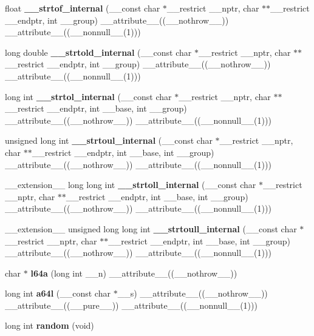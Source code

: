 \begin{DoxyCompactItemize}
\item 
float {\bf \_\-\_\-strtof\_\-internal} (\_\-\_\-const char $\ast$\_\-\_\-restrict \_\-\_\-nptr, char $\ast$$\ast$\_\-\_\-restrict \_\-\_\-endptr, int \_\-\_\-group) \_\-\_\-attribute\_\-\_\-((\_\-\_\-nothrow\_\-\_\-)) \_\-\_\-attribute\_\-\_\-((\_\-\_\-nonnull\_\-\_\-(1)))
\item 
long double {\bf \_\-\_\-strtold\_\-internal} (\_\-\_\-const char $\ast$\_\-\_\-restrict \_\-\_\-nptr, char $\ast$$\ast$\_\-\_\-restrict \_\-\_\-endptr, int \_\-\_\-group) \_\-\_\-attribute\_\-\_\-((\_\-\_\-nothrow\_\-\_\-)) \_\-\_\-attribute\_\-\_\-((\_\-\_\-nonnull\_\-\_\-(1)))
\item 
long int {\bf \_\-\_\-strtol\_\-internal} (\_\-\_\-const char $\ast$\_\-\_\-restrict \_\-\_\-nptr, char $\ast$$\ast$\_\-\_\-restrict \_\-\_\-endptr, int \_\-\_\-base, int \_\-\_\-group) \_\-\_\-attribute\_\-\_\-((\_\-\_\-nothrow\_\-\_\-)) \_\-\_\-attribute\_\-\_\-((\_\-\_\-nonnull\_\-\_\-(1)))
\item 
unsigned long int {\bf \_\-\_\-strtoul\_\-internal} (\_\-\_\-const char $\ast$\_\-\_\-restrict \_\-\_\-nptr, char $\ast$$\ast$\_\-\_\-restrict \_\-\_\-endptr, int \_\-\_\-base, int \_\-\_\-group) \_\-\_\-attribute\_\-\_\-((\_\-\_\-nothrow\_\-\_\-)) \_\-\_\-attribute\_\-\_\-((\_\-\_\-nonnull\_\-\_\-(1)))
\item 
\_\-\_\-extension\_\-\_\- long long int {\bf \_\-\_\-strtoll\_\-internal} (\_\-\_\-const char $\ast$\_\-\_\-restrict \_\-\_\-nptr, char $\ast$$\ast$\_\-\_\-restrict \_\-\_\-endptr, int \_\-\_\-base, int \_\-\_\-group) \_\-\_\-attribute\_\-\_\-((\_\-\_\-nothrow\_\-\_\-)) \_\-\_\-attribute\_\-\_\-((\_\-\_\-nonnull\_\-\_\-(1)))
\item 
\_\-\_\-extension\_\-\_\- unsigned long long int {\bf \_\-\_\-strtoull\_\-internal} (\_\-\_\-const char $\ast$\_\-\_\-restrict \_\-\_\-nptr, char $\ast$$\ast$\_\-\_\-restrict \_\-\_\-endptr, int \_\-\_\-base, int \_\-\_\-group) \_\-\_\-attribute\_\-\_\-((\_\-\_\-nothrow\_\-\_\-)) \_\-\_\-attribute\_\-\_\-((\_\-\_\-nonnull\_\-\_\-(1)))
\item 
char $\ast$ {\bf l64a} (long int \_\-\_\-n) \_\-\_\-attribute\_\-\_\-((\_\-\_\-nothrow\_\-\_\-))
\item 
long int {\bf a64l} (\_\-\_\-const char $\ast$\_\-\_\-s) \_\-\_\-attribute\_\-\_\-((\_\-\_\-nothrow\_\-\_\-)) \_\-\_\-attribute\_\-\_\-((\_\-\_\-pure\_\-\_\-)) \_\-\_\-attribute\_\-\_\-((\_\-\_\-nonnull\_\-\_\-(1)))
\item 
long int {\bf random} (void)
\item 

\end{DoxyCompactItemize}
